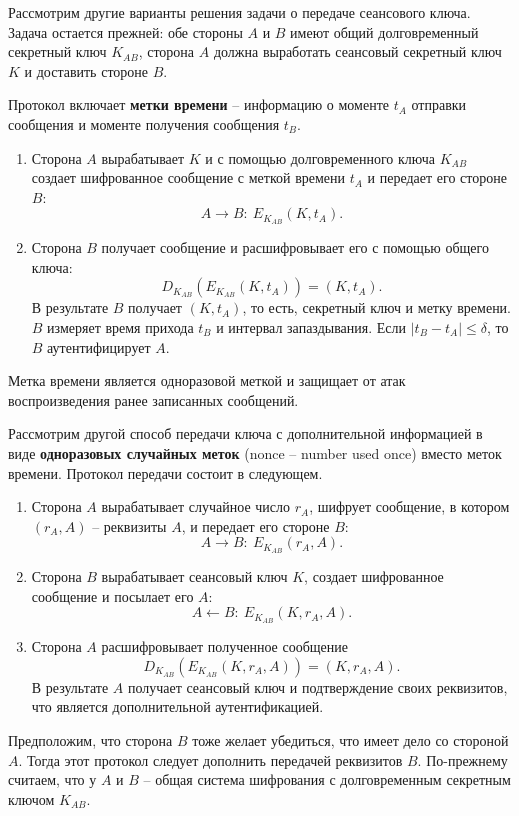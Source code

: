 \documentclass[10pt,a4paper]{book}
\begin{document}
Рассмотрим другие варианты решения задачи о передаче сеансового ключа.
Задача остается прежней: обе стороны $A$ и $B$ имеют общий долговременный секретный ключ $K_{AB}$, сторона $A$ должна выработать сеансовый секретный ключ $K$ и доставить стороне $B$.

Протокол включает \textbf{метки времени} -- информацию о моменте $t_A$ отправки сообщения и моменте получения сообщения $t_B$.

\begin{enumerate}
    \item Сторона $A$ вырабатывает $K$ и с помощью долговременного ключа $K_{AB}$ создает шифрованное сообщение с меткой времени $t_A$ и передает его стороне $B$:
            \[ A \rightarrow B: ~ E_{K_{AB}}(K, t_A). \]
    \item Сторона $B$ получает сообщение и расшифровывает его с помощью общего ключа:
            \[ D_{K_{AB}}( E_{K_{AB}}( K, t_A)) = (K, t_A). \]
        В результате $B$ получает $(K, t_A)$, то есть, секретный ключ и метку времени. $B$ измеряет время прихода $t_B$ и интервал запаздывания. Если $|t_B - t_A| \le \delta$, то $B$ аутентифицирует $A$.
\end{enumerate}
Метка времени является одноразовой меткой и защищает от атак воспроизведения ранее записанных сообщений.

Рассмотрим другой способ передачи ключа с дополнительной информацией в виде \textbf{одноразовых случайных меток} (nonce -- number used once) вместо меток времени. Протокол передачи состоит в следующем.

\begin{enumerate}
    \item Сторона $A$ вырабатывает случайное число $r_A$, шифрует сообщение, в котором  $(r_A, A)$ -- реквизиты $A$, и передает его стороне $B$:
            \[ A \rightarrow B: ~ E_{K_{AB}}(r_A, A). \]
    \item Сторона $B$ вырабатывает сеансовый ключ $K$, создает шифрованное сообщение и посылает его $A$:
            \[ A \leftarrow B: ~ E_{K_{AB}}(K, r_A, A). \]
    \item Сторона $A$ расшифровывает полученное сообщение
            \[ D_{K_{AB}}( E_{K_{AB}}( K, r_A, A)) = (K, r_A, A). \]
        В результате $A$ получает сеансовый ключ и подтверждение своих реквизитов, что является дополнительной аутентификацией.
\end{enumerate}

Предположим, что сторона $B$ тоже желает убедиться, что имеет дело со стороной $A$. Тогда этот протокол следует дополнить передачей реквизитов $B$. По-прежнему считаем, что у $A$ и $B$ -- общая система шифрования с долговременным секретным ключом $K_{AB}$.
\end{document}
